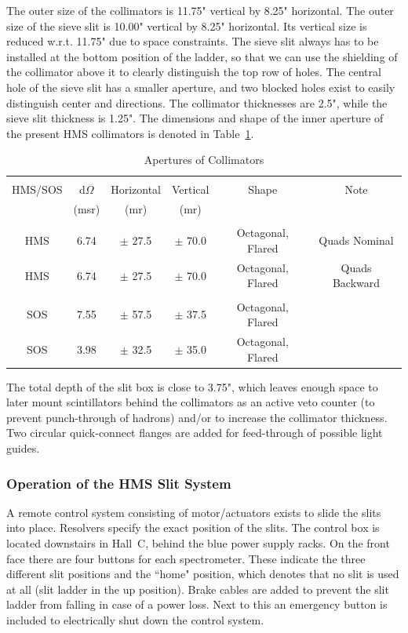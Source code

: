 The outer size of the collimators is 11.75" vertical by 8.25"
horizontal. The outer size of the sieve slit is 10.00" vertical
by 8.25" horizontal.
Its vertical size is reduced w.r.t. 11.75" due to space constraints.
The sieve slit always has to be installed at the bottom position of the ladder,
so that we can use the shielding of the collimator above it to
clearly distinguish the top row of holes. The central hole
of the sieve slit has a smaller aperture, and two blocked holes
exist to easily distinguish center and directions.
The collimator thicknesses are 2.5", while the sieve slit thickness
is 1.25". The dimensions and shape of the inner aperture of the present
HMS collimators is denoted in Table~\ref{tab:apertures}.

\begin{table}
\begin{center}
\caption{Apertures of Collimators\label{tab:apertures}}
\vspace{\baselineskip}
\begin{tabular}{|c|c|c|c|c|c|}
\hline
{} & {} & {} & {} & {} & {} \\
HMS/SOS & d$\Omega$ & Horizontal & Vertical & Shape & Note \\
{} & (msr) & (mr) & (mr) & {} & {} \\
{} & {} & {} & {} & {} & {} \\ \hline
HMS & 6.74 & $\pm$ 27.5 & $\pm$ 70.0 & Octagonal, Flared & Quads Nominal \\
HMS & 6.74 & $\pm$ 27.5 & $\pm$ 70.0 & Octagonal, Flared & Quads Backward \\
{} & {} & {} & {} & {} & {} \\
SOS & 7.55 & $\pm$ 57.5 & $\pm$ 37.5 & Octagonal, Flared & \\
SOS & 3.98 & $\pm$ 32.5 & $\pm$ 35.0 & Octagonal, Flared & \\
\hline
\end{tabular}
\end{center}
\end{table}

The total depth of the slit box is close to 3.75", which leaves
enough space to later mount scintillators behind the collimators as an active
veto counter (to prevent punch-through of hadrons) and/or to increase
the collimator thickness. Two circular quick-connect flanges are
added for feed-through of possible light guides.

\subsubsection{Operation of the HMS Slit System}\label{sssec:slit_control}
A remote control system consisting of motor/actuators exists to slide
the slits into place. Resolvers specify the exact position of the
slits.  The control box is located downstairs in Hall~C, behind the
blue power supply racks. On the front face there are four buttons for
each spectrometer. These indicate the three different slit positions
and the ``home" position, which denotes that no slit is used at all
(slit ladder in the up position).  Brake cables are added to prevent
the slit ladder from falling in case of a power loss. Next to this an
emergency button is included to electrically shut down the control
system.

